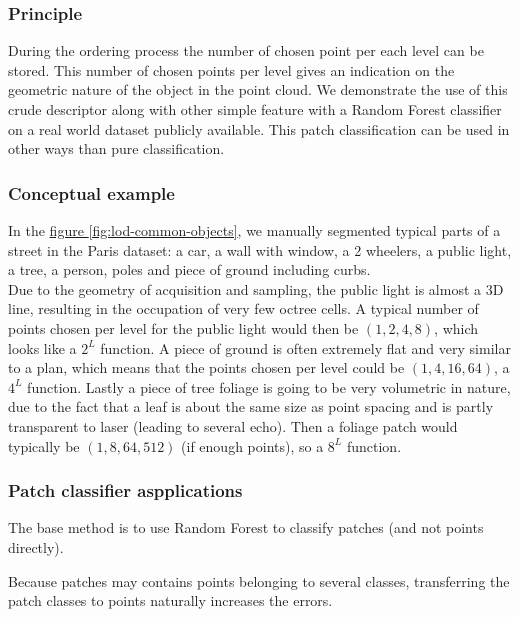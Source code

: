 		\subsubsection{Principle}
			During the ordering process the number of chosen point per each level can be stored.
			This number of chosen points per level gives an indication on the geometric nature of the object in the point cloud. 
			We demonstrate the use of this crude descriptor along with other simple feature with a Random Forest classifier on a real world dataset publicly available. 
			This patch classification can be used in other ways than pure classification.
		
		\subsubsection{Conceptual example}
			
			In the \href{fig:lod-common-objects}{figure \ref{fig:lod-common-objects}}, we manually segmented typical parts of a street in the Paris dataset: a car, a wall with window, a 2 wheelers, a public light, a tree, a person, poles and piece of ground including curbs.
			\\
			Due to the geometry of acquisition and sampling, the public light is almost a 3D line, resulting in the occupation of very few octree cells.
			A typical number of points chosen per level  for the public light would then be $(1,2,4,8)$, which looks like a $2^L$ function.
			A piece of ground is often extremely flat and very similar to a plan, which means that the points chosen per level could be $(1,4,16,64)$, a $4^L$ function.
			Lastly a piece of tree foliage is going to be very volumetric in nature, due to the fact that a leaf is about the same size as point spacing and is partly transparent to laser (leading to several echo).
			Then a foliage patch would typically be $(1,8,64,512)$ (if enough points), so a $8^L$ function.
	
	 
			
		\subsubsection{Patch classifier aspplications}
		
			The base method is to use Random Forest to classify patches (and not points directly).
			
			Because patches may contains points belonging to several classes, transferring the patch classes to points naturally increases the errors.
			

